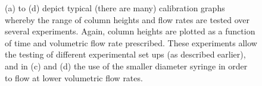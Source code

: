 \begin{figure}
\begin{center}
\end{center}
\caption[Calibration graphs for the second diode cell]{\label{fig:second_diode_small_graphs} (a) to (d) depict typical (there are many) calibration graphs whereby the range of column heights and flow rates are tested over several experiments. Again, column heights are plotted as a function of time and volumetric flow rate prescribed. These experiments allow the testing of different experimental set ups (as described earlier), and in (c) and (d) the use of the smaller diameter syringe in order to flow at lower volumetric flow rates.}
\end{figure}

